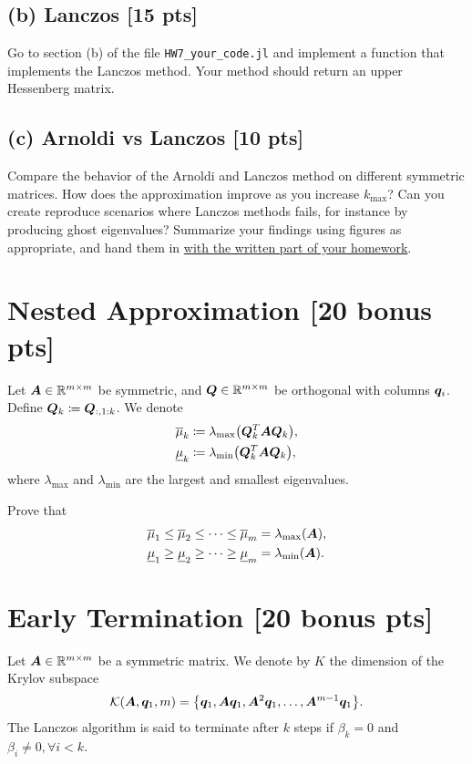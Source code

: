 \documentclass[twoside,10pt]{article}
\begin{document}
\subsection*{(b) Lanczos [15 pts]} 
Go to section (b) of the file \texttt{HW7\_your\_code.jl} and implement a function that implements the Lanczos method. 
Your method should return an upper Hessenberg matrix. 

\subsection*{(c) Arnoldi vs Lanczos [10 pts]}
Compare the behavior of the Arnoldi and Lanczos method on different symmetric matrices. 
How does the approximation improve as you increase $k_{\max}$? 
Can you create reproduce scenarios where Lanczos methods fails, for instance by producing ghost eigenvalues?
Summarize your findings using figures as appropriate, and hand them in \underline{with the written part of your homework}. 

\section{Nested Approximation [20 bonus pts]}
Let $\bm{A} \in \mathbb{R}^{m \times m}$ be symmetric, and $\bm{Q} \in \mathbb{R}^{m \times m}$ be orthogonal with columns $\bm{q}_i$. 
Define $\bm{Q}_k \coloneqq \bm{Q}_{:, 1 : k}$. 
We denote 
\begin{align}
  \overline{\mu}_k &\coloneqq \lambda_{\max} \left(\mtx{Q}_k^T \mtx{A} \mtx{Q}_k\right),\\
  \underline{\mu}_k &\coloneqq \lambda_{\min}\left(\mtx{Q}^T_k \mtx{A} \mtx{Q}_k\right),
\end{align}
where $\lambda_{\max}$ and $\lambda_{\min}$ are the largest and smallest eigenvalues.

Prove that
\begin{align}
  \overline{\mu}_{1} \leq \overline{\mu}_{2} \leq \dots \leq \overline{\mu}_m &= \lambda_{\max} \left(\mtx{A}\right),\\
  \underline{\mu}_{1} \geq \underline{\mu}_{2} \geq \dots \geq \underline{\mu}_m &= \lambda_{\min} \left(\mtx{A}\right).
\end{align}

\section{Early Termination [20 bonus pts]}
Let $\bm{A} \in \mathbb{R}^{m \times m}$ be a symmetric matrix. 
We denote by $K$ the dimension of the Krylov subspace 
\begin{equation}
  \mathcal{K}\left(\mtx{A}, \vct{q}_1, m\right) = \left\{\vct{q}_1, \mtx{A}\vct{q}_1, \mtx{A}^2 \vct{q}_1, \ldots, \mtx{A}^{m - 1} \vct{q}_1\right\}.
\end{equation}
The Lanczos algorithm is said to terminate after $k$ steps if $\beta_{k} = 0$ and $\beta_{i} \neq 0, \forall i < k$.
\end{document}
